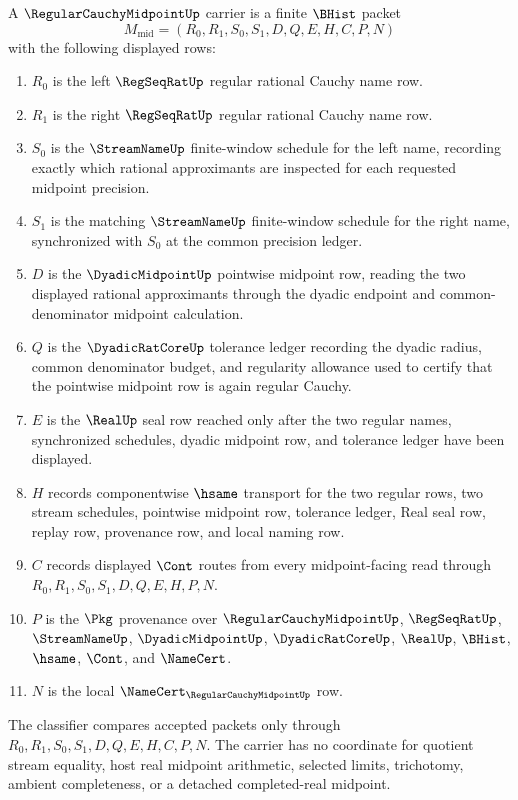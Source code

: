 \begin{definition}
\label{def:regular-cauchy-midpoint-carrier}
A $\RegularCauchyMidpointUp$ carrier is a finite $\BHist$ packet
$$
M_{\mathrm{mid}}=(R_0,R_1,S_0,S_1,D,Q,E,H,C,P,N)
$$
with the following displayed rows:
\begin{enumerate}
\item $R_0$ is the left $\RegSeqRatUp$ regular rational Cauchy name row.
\item $R_1$ is the right $\RegSeqRatUp$ regular rational Cauchy name row.
\item $S_0$ is the $\StreamNameUp$ finite-window schedule for the left name, recording exactly which rational approximants are inspected for each requested midpoint precision.
\item $S_1$ is the matching $\StreamNameUp$ finite-window schedule for the right name, synchronized with $S_0$ at the common precision ledger.
\item $D$ is the $\DyadicMidpointUp$ pointwise midpoint row, reading the two displayed rational approximants through the dyadic endpoint and common-denominator midpoint calculation.
\item $Q$ is the $\DyadicRatCoreUp$ tolerance ledger recording the dyadic radius, common denominator budget, and regularity allowance used to certify that the pointwise midpoint row is again regular Cauchy.
\item $E$ is the $\RealUp$ seal row reached only after the two regular names, synchronized schedules, dyadic midpoint row, and tolerance ledger have been displayed.
\item $H$ records componentwise $\hsame$ transport for the two regular rows, two stream schedules, pointwise midpoint row, tolerance ledger, Real seal row, replay row, provenance row, and local naming row.
\item $C$ records displayed $\Cont$ routes from every midpoint-facing read through $R_0,R_1,S_0,S_1,D,Q,E,H,P,N$.
\item $P$ is the $\Pkg$ provenance over $\RegularCauchyMidpointUp$, $\RegSeqRatUp$, $\StreamNameUp$, $\DyadicMidpointUp$, $\DyadicRatCoreUp$, $\RealUp$, $\BHist$, $\hsame$, $\Cont$, and $\NameCert$.
\item $N$ is the local $\NameCert_{\RegularCauchyMidpointUp}$ row.
\end{enumerate}
The classifier compares accepted packets only through $R_0,R_1,S_0,S_1,D,Q,E,H,C,P,N$. The carrier has no coordinate for quotient stream equality, host real midpoint arithmetic, selected limits, trichotomy, ambient completeness, or a detached completed-real midpoint.
\end{definition}

